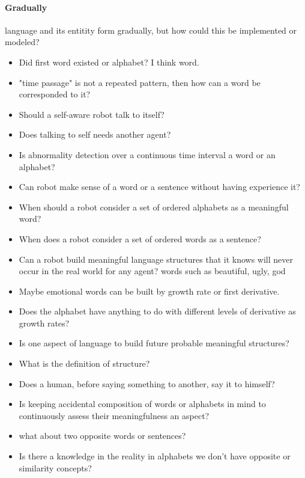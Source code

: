     \paragraph{Gradually}
        language and its entitity form gradually, but how could this be implemented or modeled?


    \begin{itemize}
        \item Did first word existed or alphabet? I think word.
        \item "time passage" is not a repeated pattern, then how can a word be corresponded to it?
        \item Should a self-aware robot talk to itself?
        \item Does talking to self needs another agent?
        \item Is abnormality detection over a continuous time interval a word or an alphabet?
        \item Can robot make sense of a word or a sentence without having experience it?
        \item When should a robot consider a set of ordered alphabets as a meaningful word?
        \item When does a robot consider a set of ordered words as a sentence?
        \item Can a robot build meaningful language structures that it knows will never occur in the real world for any agent? words such as beautiful, ugly, god
        \item Maybe emotional words can be built by growth rate or first derivative.
        \item Does the alphabet have anything to do with different levels of derivative as growth rates?
        \item Is one aspect of language to build future probable meaningful structures?
        \item What is the definition of structure?
        \item Does a human, before saying something to another, say it to himself?
        \item Is keeping accidental composition of words or alphabets in mind to continuously assess their meaningfulness an aspect?
        \item what about two opposite words or sentences?
        \item Is there a knowledge in the reality in alphabets we don't have opposite or similarity concepts?

\end{itemize}
